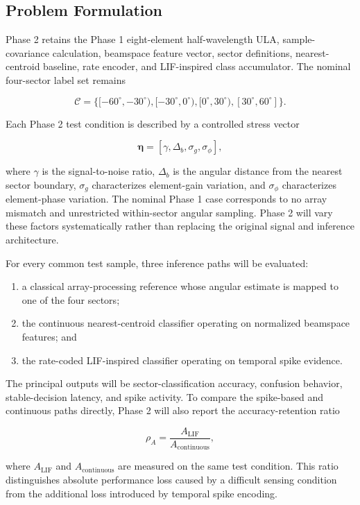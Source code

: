 \subsection{Problem Formulation}

Phase 2 retains the Phase 1 eight-element half-wavelength ULA, sample-covariance calculation, beamspace feature vector, sector definitions, nearest-centroid baseline, rate encoder, and LIF-inspired class accumulator. The nominal four-sector label set remains

\[
\mathcal{C}=\{[-60^{\circ},-30^{\circ}),[-30^{\circ},0^{\circ}),[0^{\circ},30^{\circ}),[30^{\circ},60^{\circ}]\}.
\]

Each Phase 2 test condition is described by a controlled stress vector

\[
\boldsymbol{\eta}
=
\left[
\gamma,
\Delta_{b},
\sigma_{g},
\sigma_{\phi}
\right],
\]

where $\gamma$ is the signal-to-noise ratio, $\Delta_{b}$ is the angular distance from the nearest sector boundary, $\sigma_{g}$ characterizes element-gain variation, and $\sigma_{\phi}$ characterizes element-phase variation. The nominal Phase 1 case corresponds to no array mismatch and unrestricted within-sector angular sampling. Phase 2 will vary these factors systematically rather than replacing the original signal and inference architecture.

For every common test sample, three inference paths will be evaluated:

\begin{enumerate}
    \item a classical array-processing reference whose angular estimate is mapped to one of the four sectors;
    \item the continuous nearest-centroid classifier operating on normalized beamspace features; and
    \item the rate-coded LIF-inspired classifier operating on temporal spike evidence.
\end{enumerate}

The principal outputs will be sector-classification accuracy, confusion behavior, stable-decision latency, and spike activity. To compare the spike-based and continuous paths directly, Phase 2 will also report the accuracy-retention ratio

\[
\rho_{A}
=
\frac{A_{\mathrm{LIF}}}{A_{\mathrm{continuous}}},
\]

where $A_{\mathrm{LIF}}$ and $A_{\mathrm{continuous}}$ are measured on the same test condition. This ratio distinguishes absolute performance loss caused by a difficult sensing condition from the additional loss introduced by temporal spike encoding.

